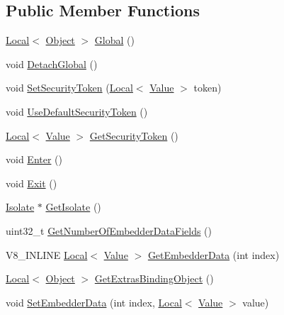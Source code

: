 \subsection*{Public Member Functions}
\begin{DoxyCompactItemize}
\item 
\mbox{\hyperlink{classv8_1_1Local}{Local}}$<$ \mbox{\hyperlink{classv8_1_1Object}{Object}} $>$ \mbox{\hyperlink{classv8_1_1Context_af5cd9f97ef6a3307c1c21f80f4b743eb}{Global}} ()
\item 
void \mbox{\hyperlink{classv8_1_1Context_a841c7dd92eb8c57df92a268a164dea97}{Detach\+Global}} ()
\item 
void \mbox{\hyperlink{classv8_1_1Context_a2351d9bdf4450d5f23734033289ba3ab}{Set\+Security\+Token}} (\mbox{\hyperlink{classv8_1_1Local}{Local}}$<$ \mbox{\hyperlink{classv8_1_1Value}{Value}} $>$ token)
\item 
void \mbox{\hyperlink{classv8_1_1Context_aa9e1a14982b64fd51ab87600a287bad2}{Use\+Default\+Security\+Token}} ()
\item 
\mbox{\hyperlink{classv8_1_1Local}{Local}}$<$ \mbox{\hyperlink{classv8_1_1Value}{Value}} $>$ \mbox{\hyperlink{classv8_1_1Context_a59d7bc98684603ec4d9b1d1db2acaad8}{Get\+Security\+Token}} ()
\item 
void \mbox{\hyperlink{classv8_1_1Context_a6995c49d9897eb49053f07874b825133}{Enter}} ()
\item 
void \mbox{\hyperlink{classv8_1_1Context_a2db09d4fefb26023a40d88972a4c1599}{Exit}} ()
\item 
\mbox{\hyperlink{classv8_1_1Isolate}{Isolate}} $\ast$ \mbox{\hyperlink{classv8_1_1Context_a7b107f60b41f3fe05a600bd2b48983be}{Get\+Isolate}} ()
\item 
uint32\+\_\+t \mbox{\hyperlink{classv8_1_1Context_a98e55c792203d20571f813e2c8ef4d5a}{Get\+Number\+Of\+Embedder\+Data\+Fields}} ()
\item 
V8\+\_\+\+I\+N\+L\+I\+NE \mbox{\hyperlink{classv8_1_1Local}{Local}}$<$ \mbox{\hyperlink{classv8_1_1Value}{Value}} $>$ \mbox{\hyperlink{classv8_1_1Context_a9cfafe0ac56f6aee17eb80a913489296}{Get\+Embedder\+Data}} (int index)
\item 
\mbox{\hyperlink{classv8_1_1Local}{Local}}$<$ \mbox{\hyperlink{classv8_1_1Object}{Object}} $>$ \mbox{\hyperlink{classv8_1_1Context_aa06026c0a9dc43874b437675b8fd0059}{Get\+Extras\+Binding\+Object}} ()
\item 
void \mbox{\hyperlink{classv8_1_1Context_a1f2f3da0b9c3d9b68a5384b757d607d2}{Set\+Embedder\+Data}} (int index, \mbox{\hyperlink{classv8_1_1Local}{Local}}$<$ \mbox{\hyperlink{classv8_1_1Value}{Value}} $>$ value)

\end{DoxyCompactItemize}
